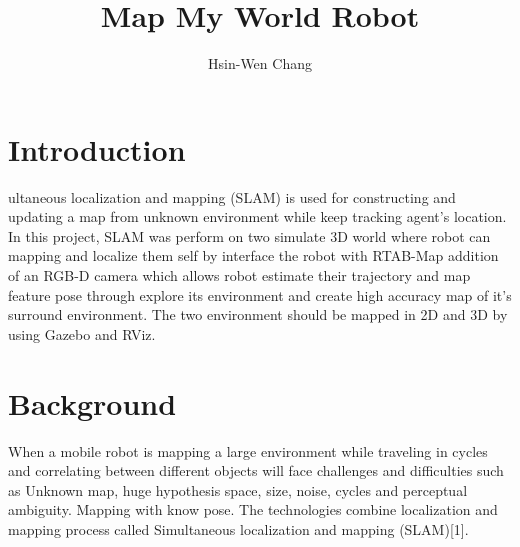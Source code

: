 \documentclass[10pt,journal,compsoc]{IEEEtran}
\begin{document}
\title{Map My World Robot}

\author{Hsin-Wen Chang}

%
{}

\maketitle
\IEEEdisplaynontitleabstractindextext
\IEEEpeerreviewmaketitle
\section{Introduction}
\label{sec:introduction}

ultaneous localization and mapping (SLAM) is used for constructing and updating a map from unknown environment while keep tracking agent's location. In this project, SLAM was perform on two simulate 3D world where robot can mapping and localize them self by interface the robot with RTAB-Map addition of an RGB-D camera which allows robot estimate their trajectory and map feature pose through explore its environment and create high accuracy map of it's surround environment. The two environment should be mapped in 2D and 3D by using Gazebo and RViz.

\section{Background}
 When a mobile robot is mapping a large environment while traveling in cycles and correlating between different objects will face challenges and difficulties such as Unknown map, huge hypothesis space, size, noise, cycles and perceptual ambiguity. Mapping with know pose. The technologies combine localization and mapping process called Simultaneous localization and mapping (SLAM)[1].
\end{document}
